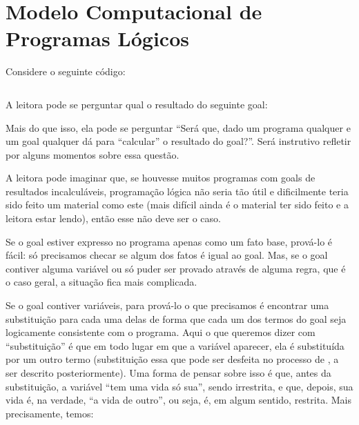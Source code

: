


\section{Modelo Computacional de Programas Lógicos}

Considere o seguinte código:

    \begin{listing}
\inputminted{prolog}{../Exemplos/Cap1/prog1_circuito.pl}\label{lst:circuit}
    \end{listing}

A leitora pode se perguntar qual o resultado do seguinte goal:


 Mais do que isso, ela pode se perguntar ``Será que, dado um programa qualquer e um goal qualquer dá para ``calcular'' o resultado
 do goal?''. Será instrutivo refletir por alguns momentos sobre essa questão.


A leitora pode imaginar que, se houvesse muitos programas com goals de resultados incalculáveis, programação lógica não seria tão útil e dificilmente teria sido feito um material como este (mais difícil ainda é o material ter sido feito e a leitora estar lendo), então esse não deve ser o caso.

Se o goal estiver expresso no programa apenas como um fato base, prová-lo é fácil: só precisamos checar se algum dos fatos é igual ao goal. Mas, se o goal contiver alguma variável ou só puder ser provado através de alguma regra, que é o caso geral, a situação fica mais complicada.

Se o goal contiver variáveis, para prová-lo o que precisamos é encontrar uma substituição para cada uma delas de forma
que cada um dos termos do goal seja logicamente consistente com o programa. Aqui o que queremos dizer com ``substituição'' é que em todo lugar em que a variável aparecer, ela é substituída por um outro termo (substituição essa que pode ser desfeita no processo de , a ser descrito posteriormente).
Uma forma de pensar sobre isso é que, antes da substituição, a variável ``tem uma vida só
sua'', sendo irrestrita, e que, depois, sua vida é, na verdade, ``a vida de
outro'', ou seja, é, em algum sentido, restrita. Mais precisamente, temos:\\

